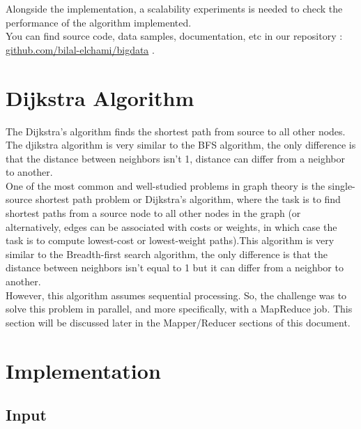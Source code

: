 \documentclass[english]{article}
\begin{document}
Alongside the implementation, a scalability experiments is needed to check the performance of the algorithm implemented.\\

You can find source code, data samples, documentation, etc in our repository : \href{ https://github.com/bilal-elchami/bigdata}{github.com/bilal-elchami/bigdata} .

\section{Dijkstra Algorithm}
The Dijkstra’s algorithm finds the shortest path from source to all other nodes. The djikstra algorithm is very similar to the BFS algorithm, the only difference is that the distance between neighbors isn't 1, distance can differ from a neighbor to another.\\

One of the most common and well-studied problems in graph theory is the single-source shortest path problem or Dijkstra’s algorithm, where the task is to find shortest paths from a source node to all other nodes in the graph (or alternatively, edges can be associated with costs or weights, in which case the task is to compute lowest-cost or lowest-weight paths).This algorithm is very similar to the Breadth-first search algorithm, the only difference is that the distance between neighbors isn't equal to 1 but it can differ from a neighbor to another.\\

However, this algorithm assumes sequential processing. So, the challenge was to solve this problem in parallel, and more specifically, with a MapReduce job. This section will be discussed later in the Mapper/Reducer sections of this document.

\newpage
\section{Implementation}
\subsection{Input}
\end{document}
